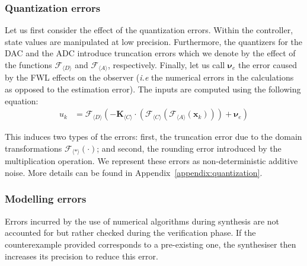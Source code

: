 \documentclass[sigconf]{llncs}
\newcommand{\mat}[1]{\boldsymbol{#1}}
\renewcommand{\vec}[1]{\boldsymbol{#1}}
\begin{document}



\subsubsection{Quantization errors} \label{sec:quantization}

Let us first consider the effect of the quantization errors. 
Within the controller, state values are manipulated at low precision.
Furthermore, the quantizers for the DAC and the ADC introduce truncation errors
which we denote by the effect of the functions $\mathcal{F}_{\langle D \rangle}$
and $\mathcal{F}_{\langle A \rangle}$, respectively. Finally, let us call $\vec{\nu}_e$ the
error caused by the FWL effects on the observer
(\emph{i.e} the numerical errors 
in the calculations as opposed to the estimation error).
The inputs are computed using the following equation: 
%
\begin{align}
u_{k}&=\mathcal{F}_{\langle D \rangle}\left(-\mat{K}_{\langle C \rangle}\cdot\left(\mathcal{F}_{\langle C \rangle}\left(\mathcal{F}_{\langle A \rangle}(\vec{x}_{k})\right)\right) +\vec{\nu}_e\right)
\label{eq:uk}
\end{align}

This induces two types of the errors: first, the truncation
error due to the domain transformations $\mathcal{F}_{\langle *
\rangle}(\cdot)$; and second, the rounding error introduced by the
multiplication operation.  We represent these errors as non-deterministic
additive noise. More details can be found in Appendix~\ref{appendix:quantization}.

\subsubsection{Modelling errors}

Errors incurred by the use of numerical algorithms during synthesis are not
accounted for but rather checked during the verification phase.  If the
counterexample provided corresponds to a pre-existing one, the synthesiser
then increases its precision to reduce this error.
\end{document}
